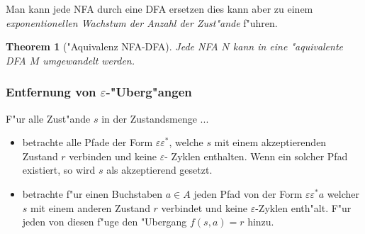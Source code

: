 \documentclass[german, 10pt, a4paper, twocolumn]{scrartcl}
\newtheorem{theorem}{Theorem}[section]
\theoremstyle{definition}
\theoremstyle{example}
\begin{document}
Man kann jede NFA durch eine DFA ersetzen dies kann aber zu einem \textit{exponentionellen Wachstum der Anzahl der Zust"ande} f"uhren.

\begin{theorem}["Aquivalenz NFA-DFA]
	Jede NFA $N$ kann in eine "aquivalente DFA $M$ umgewandelt werden.
\end{theorem}

\subsubsection{Entfernung von $\varepsilon$-"Uberg"angen}

F"ur alle Zust"ande $s$ in der Zustandsmenge ...
\begin{itemize}
	\item betrachte alle Pfade der Form $\varepsilon \varepsilon^*$, welche $s$ mit einem akzeptierenden Zustand $r$ verbinden und keine $\varepsilon$- Zyklen enthalten. Wenn ein solcher Pfad existiert, so wird $s$ als akzeptierend gesetzt.
		\begin{figure}[htb]
			\begin{center}
				\MediumPicture
			\end{center}
		\end{figure}
	\item betrachte f"ur einen Buchstaben $a \in A$ jeden Pfad von der Form $\varepsilon\varepsilon^* a$ welcher $s$ mit einem anderen Zustand $r$ verbindet und keine $\varepsilon$-Zyklen enth"alt. F"ur jeden von diesen f"uge den "Ubergang $f(s,a)=r$ hinzu.
		\begin{figure}[htb]
			\begin{center}
				\MediumPicture
\end{center}
\end{figure}
\end{itemize}
\end{document}
